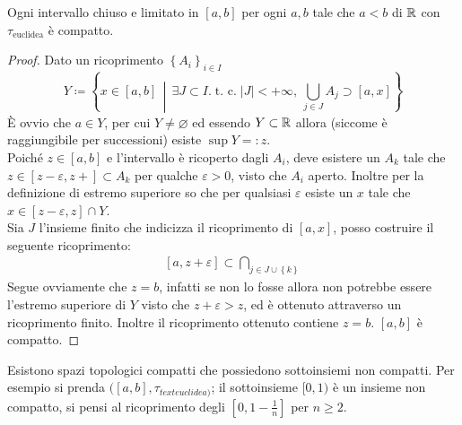 \begin{theorem}
	Ogni intervallo chiuso e limitato in $\left[a, b\right]$ per ogni $a, b$ tale che $a < b$ di $\mathbb{R}$ con $\tau_{\text{euclidea}}$ è compatto.
\end{theorem} 
\begin{proof}
	Dato un ricoprimento $\left\{A_i\right\}_{i \in I}$ 
	\begin{equation*}
			Y \coloneqq \left\{ x\in \left[a,b\right] \,\middle|\, \exists J \subset I. \; \text{t. c.} \; |J| < +\infty,\ \bigcup_{j \in J} A_j \supset \left[a,x\right] \right\}
	\end{equation*}
	È ovvio che $a \in Y$, per cui $Y \neq \varnothing$ ed essendo $Y \subset \mathbb{R}$ allora (siccome è raggiungibile per successioni) esiste $\sup Y =: z$. \\ Poiché $z \in \left[a,b\right]$ e l'intervallo è ricoperto dagli $A_i$, deve esistere un $A_{k}$ tale che $z \in [z-\varepsilon, z+] \subset A_k$ per qualche $\varepsilon > 0$, visto che $A_i$ aperto. Inoltre per la definizione di estremo superiore so che per qualsiasi $\varepsilon$ esiste un $x$ tale che $x \in \left[z-\varepsilon, z\right] \cap Y$. \\ Sia $J$ l'insieme finito che indicizza il ricoprimento di $[a,x]$, posso costruire il seguente ricoprimento:
	\begin{align*}
		\left[a,z+\varepsilon\right] \subset \bigcap_{j \in J\cup \left\{k\right\}}
	\end{align*}
Segue ovviamente che $z = b$, infatti se non lo fosse allora non potrebbe essere l'estremo superiore di $Y$ visto che $z+\varepsilon > z$, ed è ottenuto attraverso un ricoprimento finito. Inoltre il ricoprimento ottenuto contiene $z = b$. $\left[a,b\right]$ è compatto.
\end{proof}

\begin{remark}
	Esistono spazi topologici compatti che possiedono sottoinsiemi non compatti. Per esempio si prenda $(\left[a, b\right],\tau_{text{euclidea})}$; il sottoinsieme $[0, 1)$ è un insieme non compatto, si pensi al ricoprimento degli $[0,1-\frac{1}{n}]$ per $n \geq 2$.
\end{remark} 

